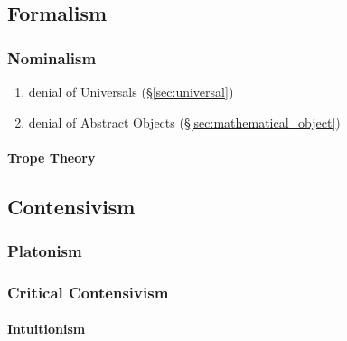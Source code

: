 \subsection{Formalism}\label{sec:formalism}

\subsubsection{Nominalism}\label{sec:nominalism}

\begin{enumerate}
  \item denial of Universals (\S\ref{sec:universal})
  \item denial of Abstract Objects (\S\ref{sec:mathematical_object})
\end{enumerate}



\paragraph{Trope Theory}\label{sec:trope_theory}



\subsection{Contensivism}\label{sec:contensivism}

\subsubsection{Platonism}\label{sec:platonism}

\subsubsection{Critical Contensivism}\label{sec:critical_contensivism}

\paragraph{Intuitionism}\label{sec:intuitionism}



